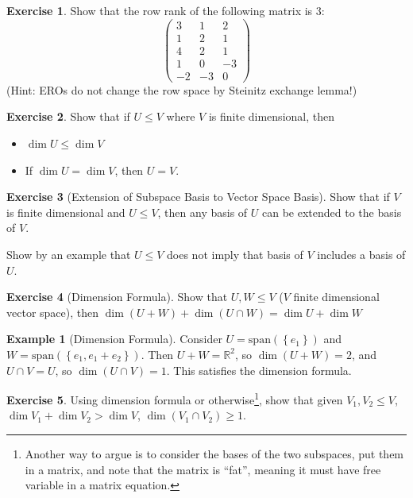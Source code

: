 \documentclass[12pt, a4paper]{article}
\newcommand{\R}{\mathbb{R}}
\newcommand{\spantext}{\text{span}}
\theoremstyle{remark}
\theoremstyle{definition}
\newtheorem{example}{Example}
\newtheorem{exercise}{Exercise}
\numberwithin{equation}{section}
\numberwithin{definition}{section}
\numberwithin{example}{section}
\numberwithin{exercise}{section}
\numberwithin{remark}{section}
\numberwithin{figure}{section}
\begin{document}
\begin{exercise}
    Show that the row rank of the following matrix is 3:
    \begin{equation*}
        \begin{pmatrix}
            3 & 1 & 2 \\
            1 & 2 & 1 \\
            4 & 2 & 1 \\
            1 & 0 & -3 \\
            -2 & -3 & 0
        \end{pmatrix}
    \end{equation*}
    (Hint: EROs do not change the row space by Steinitz exchange lemma!)
\end{exercise}
\begin{exercise}
    Show that if $U \leq V$ where $V$ is finite dimensional, then
    \begin{itemize}
        \item $\dim U \leq \dim V$
        \item If $\dim U = \dim V$, then $U = V$.
    \end{itemize}
\end{exercise}
\begin{exercise}[Extension of Subspace Basis to Vector Space Basis]
    Show that if $V$ is finite dimensional and $U \leq V$, then
    any basis of $U$ can be extended to the basis of $V$.
    
    Show by an example that $U \leq V$ does not imply that basis of $V$  includes a basis of $U$.
\end{exercise}
\begin{exercise}[Dimension Formula]
    Show that $U,W \leq V$ ($V$ finite dimensional vector space), then
    $\dim \left( U+W \right) + \dim \left( U \cap W \right) = \dim U + \dim W$
\end{exercise}
\begin{example}[Dimension Formula]
    Consider $U = \spantext \left( \left\{ e_1 \right\} \right)$ and $W = \spantext \left( \left\{ e_1, e_1 + e_2 \right\} \right)$.
    Then $U + W = \R^2$, so $\dim \left( U + W \right) = 2$,
    and $U \cap V = U$, so $\dim \left( U \cap V \right) = 1$.
    This satisfies the dimension formula.
\end{example}
\begin{exercise}
    Using dimension formula or otherwise\footnote{Another way to argue is to consider the bases of the two subspaces, put them in a matrix, and note that the matrix is ``fat'', meaning it must have free variable in a matrix equation.},
    show that given $V_1, V_2 \leq V$, $\dim V_1 + \dim V_2 > \dim V$,
    $\dim \left( V_1 \cap V_2 \right) \geq 1$.
\end{exercise}
\end{document}
